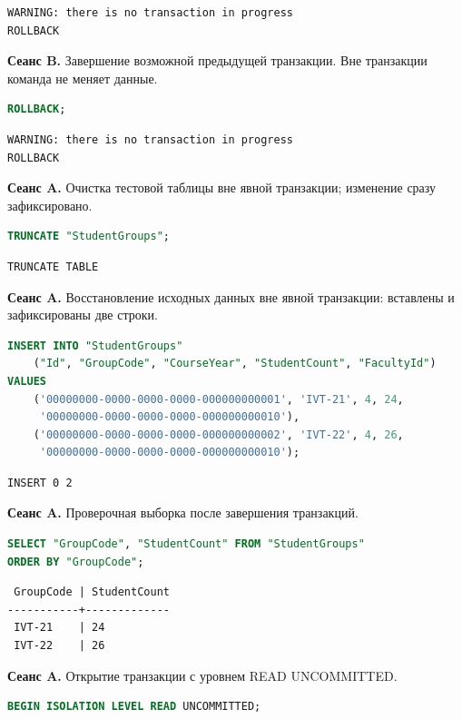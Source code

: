 \documentclass[12pt,a4paper]{article}
\begin{document}
\begin{lstlisting}
WARNING: there is no transaction in progress
ROLLBACK
\end{lstlisting}

\textbf{Сеанс B.} Завершение возможной предыдущей транзакции. Вне транзакции команда не меняет данные.
\begin{lstlisting}[language=SQL]
ROLLBACK;
\end{lstlisting}

\begin{lstlisting}
WARNING: there is no transaction in progress
ROLLBACK
\end{lstlisting}

\textbf{Сеанс A.} Очистка тестовой таблицы вне явной транзакции; изменение сразу зафиксировано.
\begin{lstlisting}[language=SQL]
TRUNCATE "StudentGroups";
\end{lstlisting}

\begin{lstlisting}
TRUNCATE TABLE
\end{lstlisting}

\textbf{Сеанс A.} Восстановление исходных данных вне явной транзакции: вставлены и зафиксированы две строки.
\begin{lstlisting}[language=SQL]
INSERT INTO "StudentGroups"
    ("Id", "GroupCode", "CourseYear", "StudentCount", "FacultyId")
VALUES
    ('00000000-0000-0000-0000-000000000001', 'IVT-21', 4, 24,
     '00000000-0000-0000-0000-000000000010'),
    ('00000000-0000-0000-0000-000000000002', 'IVT-22', 4, 26,
     '00000000-0000-0000-0000-000000000010');
\end{lstlisting}

\begin{lstlisting}
INSERT 0 2
\end{lstlisting}

\textbf{Сеанс A.} Проверочная выборка после завершения транзакций.
\begin{lstlisting}[language=SQL]
SELECT "GroupCode", "StudentCount" FROM "StudentGroups"
ORDER BY "GroupCode";
\end{lstlisting}

\begin{lstlisting}
 GroupCode | StudentCount
-----------+-------------
 IVT-21    | 24
 IVT-22    | 26
\end{lstlisting}

\textbf{Сеанс A.} Открытие транзакции с уровнем READ UNCOMMITTED.
\begin{lstlisting}[language=SQL]
BEGIN ISOLATION LEVEL READ UNCOMMITTED;
\end{lstlisting}
\end{document}
